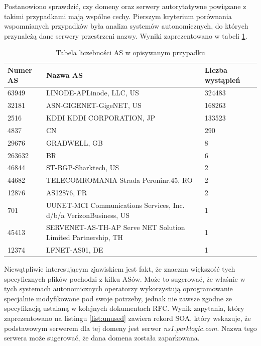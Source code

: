 Postanowiono sprawdzić, czy domeny oraz serwery autorytatywne powiązane z takimi przypadkami mają
wspólne cechy. Pierszym kryterium porównania wspomnianych przypadków była analiza systemów autonomicznych, do których przynależą
dane serwery przestrzeni nazwy. Wyniki zaprezentowano w tabeli \ref{tab:unused}.
\begin{table}[h]
	\centering
	\caption{Tabela liczebności AS w opisywanym przypadku}
	\label{tab:unused}
	\begin{tabular}{|p{}|p{}|p{}|}
		\hline
		\textbf{Numer AS} &
		\textbf{Nazwa AS} &
		\textbf{Liczba wystąpień} \\
		\hline\hline
		63949 & LINODE-APLinode, LLC, US & 324483 \\
		\hline
		32181 & ASN-GIGENET-GigeNET, US & 168263 \\
		\hline
		2516 & KDDI KDDI CORPORATION, JP & 133523 \\
		\hline
		4837 &  CN & 290 \\
		\hline
		29676 & GRADWELL, GB & 8 \\
		\hline
		263632 & BR & 6 \\
		\hline
		46844 & ST-BGP-Sharktech, US & 2 \\
		\hline
		44682 & TELECOMROMANIA Strada Peroninr.45, RO & 2 \\
		\hline
		12876 & AS12876, FR & 2 \\
		\hline
		701 & UUNET-MCI Communications Services, Inc. d/b/a VerizonBusiness, US & 1 \\
		\hline
		45413 & SERVENET-AS-TH-AP Serve NET Solution Limited Partnership, TH & 1 \\
		\hline
		12374 & LFNET-AS01, DE & 1 \\
		\hline
	\end{tabular}
\end{table}

Niewątpliwie interesującym zjawiskiem jest fakt, że znaczna większość tych specyficznych plików pochodzi z kilku ASów.
Może to sugerować, że właśnie w tych systemach autonomicznych operatorzy wykorzystują oprogramowanie specjalnie modyfikowane
pod swoje potrzeby, jednak nie zawsze zgodne ze specyfikacją ustalaną w kolejnych dokumentach RFC. Wynik zapytania, który zaprezentowano
na listingu \ref{list:unused} zawiera rekord SOA, który wskazuje, że podstawowym serwerem dla tej domeny jest
serwer \textit{ns1.parklogic.com}. Nazwa tego serwera może sugerować, że dana domena została zaparkowana. \cite{todo:koniecznie}

